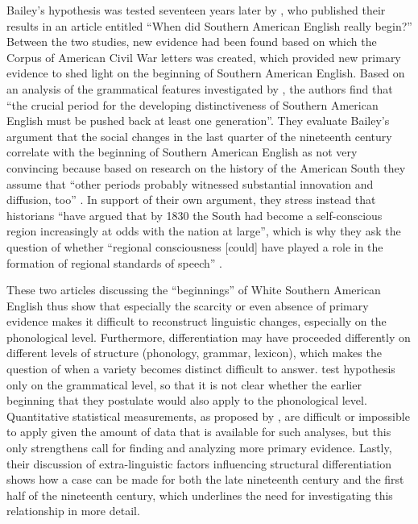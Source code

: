 Bailey’s hypothesis was tested seventeen years later by \citet{Montgomery2014}, who published their results in an article entitled “When did Southern American English really begin?” Between the two studies, new evidence had been found based on which the Corpus of American Civil War letters was created, which provided new primary evidence to shed light on the beginning of Southern American English. Based on an analysis of the grammatical features investigated by \citet{Bailey1997}, the authors find that “the crucial period for the developing distinctiveness of Southern American English must be pushed back at least one generation”. They evaluate Bailey’s argument that the social changes in the last quarter of the nineteenth century correlate with the beginning of Southern American English as not very convincing because based on research on the history of the American South they assume that “other periods probably witnessed substantial innovation and diffusion, too” \citep[334]{Montgomery2014}. In support of their own argument, they stress instead that historians “have argued that by 1830 the South had become a self-conscious region increasingly at odds with the nation at large”, which is why they ask the question of whether “regional consciousness [could] have played a role in the formation of regional standards of speech” \citep[345]{Montgomery2014}.

These two articles discussing the “beginnings” of White Southern American English thus show that especially the scarcity or even absence of primary evidence makes it difficult to reconstruct linguistic changes, especially on the phonological level. Furthermore, differentiation may have proceeded differently on different levels of structure (phonology, grammar, lexicon), which makes the question of when a variety becomes distinct difficult to answer. \citet{Montgomery2014} test  hypothesis only on the grammatical level, so that it is not clear whether the earlier beginning that they postulate would also apply to the phonological level. Quantitative statistical measurements, as proposed by \citet{Pickl2016}, are difficult or impossible to apply given the amount of data that is available for such analyses, but this only strengthens  call for finding and analyzing more primary evidence. Lastly, their discussion of extra-linguistic factors influencing structural differentiation shows how a case can be made for both the late nineteenth century and the first half of the nineteenth century, which underlines the need for investigating this relationship in more detail.

